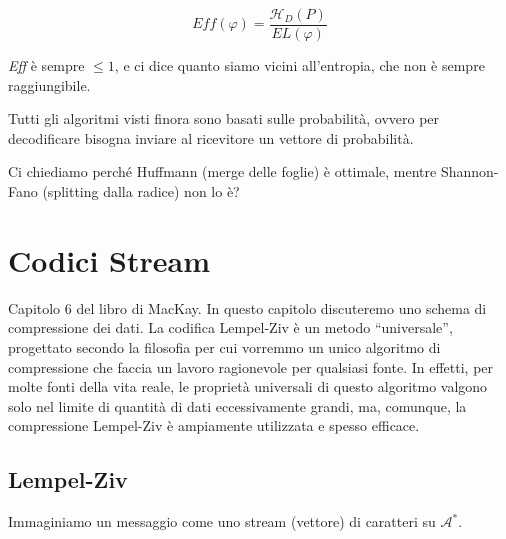 \begin{definition}
    $$
        Eff(\varphi) = \frac{\mathcal{H}_D(P)}{EL(\varphi)}
    $$
\end{definition}
\emph{Eff} è sempre $\leq 1$, e ci dice quanto siamo vicini all'entropia, che non è sempre raggiungibile.\medskip

Tutti gli algoritmi visti finora sono basati sulle probabilità, ovvero per decodificare bisogna inviare al ricevitore un vettore di probabilità.

Ci chiediamo perché Huffmann (merge delle foglie) è ottimale, mentre Shannon-Fano (splitting dalla radice) non lo è?


\section{Codici Stream}
Capitolo 6 del libro di MacKay. In questo capitolo discuteremo uno schema di compressione dei dati. La codifica Lempel-Ziv è un metodo ``universale'', progettato secondo la filosofia per cui vorremmo un unico algoritmo di compressione che faccia un lavoro ragionevole per qualsiasi fonte. In effetti, per molte fonti della vita reale, le proprietà universali di questo algoritmo valgono solo nel limite di quantità di dati eccessivamente grandi, ma, comunque, la compressione Lempel-Ziv è ampiamente utilizzata e spesso efficace.




\subsection{Lempel-Ziv}
Immaginiamo un messaggio come uno stream (vettore) di caratteri su $\mathcal{A}^*$.

